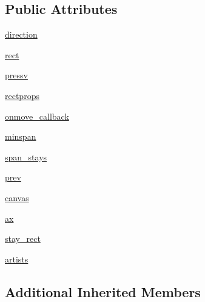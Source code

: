 \subsection*{Public Attributes}
\begin{DoxyCompactItemize}
\item 
\hyperlink{classmatplotlib_1_1widgets_1_1SpanSelector_a8d088006a62702b98be45481c8aec82e}{direction}
\item 
\hyperlink{classmatplotlib_1_1widgets_1_1SpanSelector_a5aa0d6991261a746694068075898e224}{rect}
\item 
\hyperlink{classmatplotlib_1_1widgets_1_1SpanSelector_aa54858dccb5905007caf6353ed169600}{pressv}
\item 
\hyperlink{classmatplotlib_1_1widgets_1_1SpanSelector_a2d3e724bbd1972ca638085908fd7640a}{rectprops}
\item 
\hyperlink{classmatplotlib_1_1widgets_1_1SpanSelector_ac5074f31aa549cb91d944d41db212a55}{onmove\+\_\+callback}
\item 
\hyperlink{classmatplotlib_1_1widgets_1_1SpanSelector_a5104df236cba524cff0b4e9ab8e10c63}{minspan}
\item 
\hyperlink{classmatplotlib_1_1widgets_1_1SpanSelector_a50326a48b2ae33185e2d69134e7def56}{span\+\_\+stays}
\item 
\hyperlink{classmatplotlib_1_1widgets_1_1SpanSelector_af739e9453025c74a0f01751ceb8a036c}{prev}
\item 
\hyperlink{classmatplotlib_1_1widgets_1_1SpanSelector_acbdb1c68061c11288dcb6a3f26513680}{canvas}
\item 
\hyperlink{classmatplotlib_1_1widgets_1_1SpanSelector_aa8892b223c155d636534bd94c19afb16}{ax}
\item 
\hyperlink{classmatplotlib_1_1widgets_1_1SpanSelector_a1942ae4ff7a139cb3e4c1006621cf3af}{stay\+\_\+rect}
\item 
\hyperlink{classmatplotlib_1_1widgets_1_1SpanSelector_a57b62ab3c6ccc290b7c01b138eb92563}{artists}
\end{DoxyCompactItemize}
\subsection*{Additional Inherited Members}


